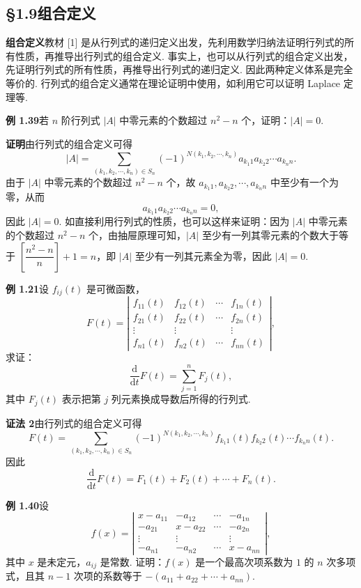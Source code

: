 \documentclass[UTF8,12pt,a4paper,fontset=fandol]{ctexart}
\begin{document}
\subsection*{§1.9\quad 组合定义}

\noindent\textbf{组合定义}\quad 教材 [1] 是从行列式的递归定义出发，先利用数学归纳法证明行列式的所有性质，再推导出行列式的组合定义. 事实上，也可以从行列式的组合定义出发，先证明行列式的所有性质，再推导出行列式的递归定义. 因此两种定义体系是完全等价的. 行列式的组合定义通常在理论证明中使用，如利用它可以证明 Laplace 定理等.

\noindent\textbf{例 1.39}\quad 若 $n$ 阶行列式 $|A|$ 中零元素的个数超过 $n^2-n$ 个，证明：$|A|=0$.

\noindent\textbf{证明}\quad 由行列式的组合定义可得
\[
|A|=\sum_{(k_1,k_2,\cdots,k_n)\in S_n}
(-1)^{N(k_1,k_2,\cdots,k_n)}a_{k_1 1}a_{k_2 2}\cdots a_{k_n n}.
\]
由于 $|A|$ 中零元素的个数超过 $n^2-n$ 个，故 $a_{k_1 1},a_{k_2 2},\cdots,a_{k_n n}$ 中至少有一个为零，从而
\[
a_{k_1 1}a_{k_2 2}\cdots a_{k_n n}=0,
\]
因此 $|A|=0$. 如直接利用行列式的性质，也可以这样来证明：因为 $|A|$ 中零元素的个数超过 $n^2-n$ 个，由抽屉原理可知，$|A|$ 至少有一列其零元素的个数大于等于 $\left[\dfrac{n^2-n}{n}\right]+1=n$，即 $|A|$ 至少有一列其元素全为零，因此 $|A|=0$.

\noindent\textbf{例 1.21}\quad 设 $f_{ij}(t)$ 是可微函数，
\[
F(t)=\left|\begin{array}{cccc}
f_{11}(t) & f_{12}(t) & \cdots & f_{1n}(t)\\
f_{21}(t) & f_{22}(t) & \cdots & f_{2n}(t)\\
\vdots & \vdots &        & \vdots\\
f_{n1}(t) & f_{n2}(t) & \cdots & f_{nn}(t)
\end{array}\right|,
\]
求证：
\[
\frac{\mathrm{d}}{\mathrm{d}t}F(t)=\sum_{j=1}^nF_j(t),
\]
其中 $F_j(t)$ 表示把第 $j$ 列元素换成导数后所得的行列式.

\noindent\textbf{证法 2}\quad 由行列式的组合定义可得
\[
F(t)=\sum_{(k_1,k_2,\cdots,k_n)\in S_n}
(-1)^{N(k_1,k_2,\cdots,k_n)}f_{k_1 1}(t)f_{k_2 2}(t)\cdots f_{k_n n}(t).
\]
因此
\[
\frac{\mathrm{d}}{\mathrm{d}t}F(t)=F_1(t)+F_2(t)+\cdots+F_n(t).
\]

\noindent\textbf{例 1.40}\quad 设
\[
f(x)=\left|\begin{array}{cccc}
x-a_{11} & -a_{12} & \cdots & -a_{1n}\\
-a_{21} & x-a_{22} & \cdots & -a_{2n}\\
\vdots & \vdots &        & \vdots\\
-a_{n1} & -a_{n2} & \cdots & x-a_{nn}
\end{array}\right|,
\]
其中 $x$ 是未定元，$a_{ij}$ 是常数. 证明：$f(x)$ 是一个最高次项系数为 $1$ 的 $n$ 次多项式，且其 $n-1$ 次项的系数等于 $-(a_{11}+a_{22}+\cdots+a_{nn})$.
\end{document}
